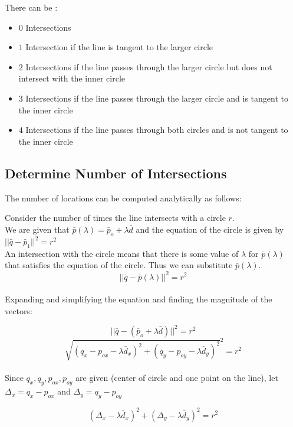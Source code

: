\documentclass[a4paper,10pt]{scrartcl}
\begin{document}
There can be :

\begin{itemize}
 \item $0$ Intersections
 \item $1$ Intersection if the line is tangent to the larger circle
 \item $2$ Intersections if the line passes through the larger circle but does not intersect with the inner circle
 \item $3$ Intersections if the line passes through the larger circle and is tangent to the inner circle
 \item $4$ Intersections if the line passes through both circles and is not tangent to the inner circle
\end{itemize}

\subsection{Determine Number of Intersections}

The number of locations can be computed analytically as follows:

Consider the number of times the line intersects with a circle $r$.\\

We are given that $\bar p(\lambda) = \bar p_o + \lambda\bar d$ and the equation of the circle is given by \\$||\bar q - \bar p_1 ||^2 = r^2$\\

An intersection with the circle means that there is some value of $\lambda$ for $\bar p(\lambda)$ that satisfies the equation of the circle. Thus we can substitute $\bar p(\lambda)$.\\

\[||\bar q - \bar p(\lambda)||^2 = r^2\]\\

Expanding and simplifying the equation and finding the magnitude of the vectors:

\[||\bar q - (\bar p_o + \lambda\bar d) || ^2 = r^2\]
\[\sqrt{ (q_x - p_{ox} - \lambda\bar d_x)^2 +  (q_y - p_{oy} - \lambda\bar d_y)^2}^2  = r^2\]\\

Since $q_x, q_y, p_{ox}, p_{oy}$ are given (center of circle and one point on the line), let $\Delta_x = q_x - p_{ox}$ and $\Delta_y = q_y - p_{oy}$

\[(\Delta_x - \lambda\bar d_x)^2 +  (\Delta_y - \lambda\bar d_y)^2  = r^2\]\\
\end{document}
